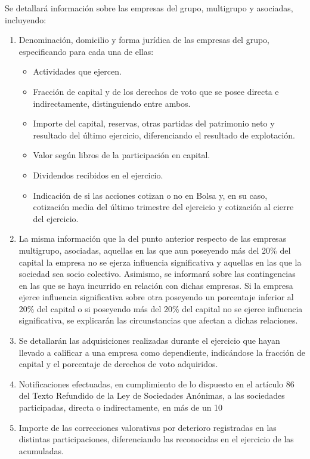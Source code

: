 \documentclass[11pt,a4paper]{article}
\begin{document}
\begin{enumerate}
Se detallará información sobre las empresas del grupo, multigrupo y asociadas, incluyendo:
  \begin{enumerate}
   \item Denominación, domicilio y forma jurídica de las empresas del grupo, especificando para cada una de ellas:
     \begin{itemize}
       \item Actividades que ejercen.
       \item Fracción de capital y de los derechos de voto que se posee directa e indirectamente, distinguiendo entre ambos.
       \item Importe del capital, reservas, otras partidas del patrimonio neto y resultado del último ejercicio, diferenciando el resultado de explotación.
       \item Valor según libros de la participación en capital.
       \item Dividendos recibidos en el ejercicio.
       \item Indicación de si las acciones cotizan o no en Bolsa y, en su caso, cotización media del último trimestre del ejercicio y cotización al cierre del ejercicio.
     \end{itemize}

   \item La misma información que la del punto anterior respecto de las empresas multigrupo, asociadas, aquellas en las que aun poseyendo más del 20\% del capital la empresa no se ejerza influencia significativa y aquellas en las que la sociedad sea socio colectivo. Asimismo, se informará sobre las contingencias en las que se haya incurrido en relación con dichas empresas. Si la empresa ejerce influencia significativa sobre otra poseyendo un porcentaje inferior al 20\% del capital o si poseyendo más del 20\% del capital no se ejerce influencia significativa, se explicarán las circunstancias que afectan a dichas relaciones.

   \item Se detallarán las adquisiciones realizadas durante el ejercicio que hayan llevado a calificar a una empresa como dependiente, indicándose la fracción de capital y el porcentaje de derechos de voto adquiridos.

   \item Notificaciones efectuadas, en cumplimiento de lo dispuesto en el artículo 86 del Texto Refundido de la Ley de Sociedades Anónimas, a las sociedades participadas, directa o indirectamente, en más de un 10%

   \item Importe de las correcciones valorativas por deterioro registradas en las distintas participaciones, diferenciando las reconocidas en el ejercicio de las acumuladas.
  \end{enumerate}

\end{enumerate}
\end{document}
